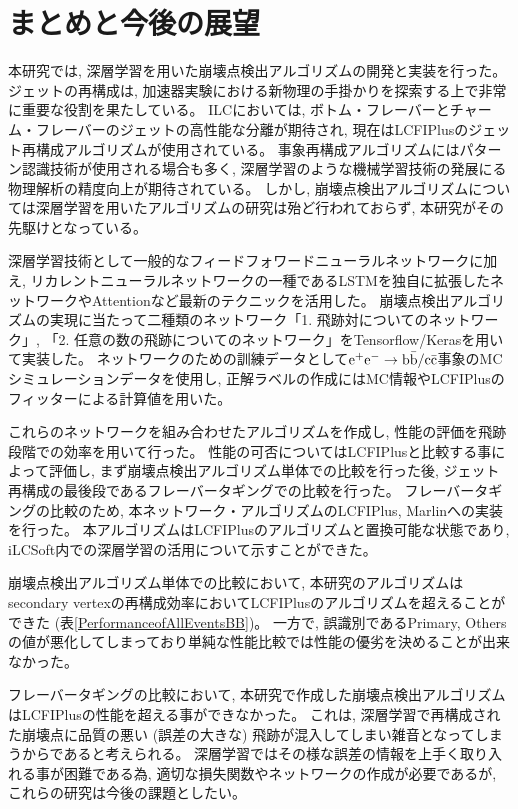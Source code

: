 
\chapter{まとめと今後の展望} \label{chap:Conclusion}

本研究では, 深層学習を用いた崩壊点検出アルゴリズムの開発と実装を行った。
ジェットの再構成は, 加速器実験における新物理の手掛かりを探索する上で非常に重要な役割を果たしている。
ILCにおいては, ボトム・フレーバーとチャーム・フレーバーのジェットの高性能な分離が期待され, 現在はLCFIPlusのジェット再構成アルゴリズムが使用されている。
事象再構成アルゴリズムにはパターン認識技術が使用される場合も多く, 深層学習のような機械学習技術の発展にる物理解析の精度向上が期待されている。
しかし, 崩壊点検出アルゴリズムについては深層学習を用いたアルゴリズムの研究は殆ど行われておらず, 本研究がその先駆けとなっている。

深層学習技術として一般的なフィードフォワードニューラルネットワークに加え, リカレントニューラルネットワークの一種であるLSTMを独自に拡張したネットワークやAttentionなど最新のテクニックを活用した。
崩壊点検出アルゴリズムの実現に当たって二種類のネットワーク「1. 飛跡対についてのネットワーク」, 「2. 任意の数の飛跡についてのネットワーク」をTensorflow/Kerasを用いて実装した。
ネットワークのための訓練データとして$\rm e^+e^- \to b \bar{b}/c \bar{c}$事象のMCシミュレーションデータを使用し, 正解ラベルの作成にはMC情報やLCFIPlusのフィッターによる計算値を用いた。

これらのネットワークを組み合わせたアルゴリズムを作成し, 性能の評価を飛跡段階での効率を用いて行った。
性能の可否についてはLCFIPlusと比較する事によって評価し, まず崩壊点検出アルゴリズム単体での比較を行った後, ジェット再構成の最後段であるフレーバータギングでの比較を行った。
フレーバータギングの比較のため, 本ネットワーク・アルゴリズムのLCFIPlus, Marlinへの実装を行った。
本アルゴリズムはLCFIPlusのアルゴリズムと置換可能な状態であり, iLCSoft内での深層学習の活用について示すことができた。

崩壊点検出アルゴリズム単体での比較において, 本研究のアルゴリズムはsecondary vertexの再構成効率においてLCFIPlusのアルゴリズムを超えることができた (表\ref{PerformanceofAllEventsBB})。
一方で, 誤識別であるPrimary, Othersの値が悪化してしまっており単純な性能比較では性能の優劣を決めることが出来なかった。

フレーバータギングの比較において, 本研究で作成した崩壊点検出アルゴリズムはLCFIPlusの性能を超える事ができなかった。
これは, 深層学習で再構成された崩壊点に品質の悪い (誤差の大きな) 飛跡が混入してしまい雑音となってしまうからであると考えられる。
深層学習ではその様な誤差の情報を上手く取り入れる事が困難である為, 適切な損失関数やネットワークの作成が必要であるが, これらの研究は今後の課題としたい。\\

